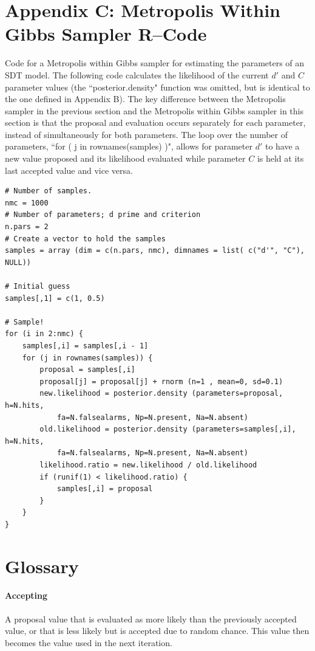 \section*{Appendix C: Metropolis Within Gibbs Sampler R--Code}

Code for a Metropolis within Gibbs sampler for estimating the parameters of an SDT model. The following code calculates the likelihood of the current $d'$ and $C$ parameter values (the ``posterior.density" function was omitted, but is identical to the one defined in Appendix B). The key difference between the Metropolis sampler in the previous section and the Metropolis within Gibbs sampler in this section is that the proposal and evaluation occurs separately for each parameter, instead of simultaneously for both parameters. The loop over the number of parameters, ``for ( j in rownames(samples) )", allows for parameter $d'$ to have a new value proposed and its likelihood evaluated while parameter $C$ is held at its last accepted value and vice versa.

\begin{verbatim}
# Number of samples.
nmc = 1000 	
# Number of parameters; d prime and criterion
n.pars = 2 
# Create a vector to hold the samples
samples = array (dim = c(n.pars, nmc), dimnames = list( c("d'", "C"), NULL))
	
# Initial guess
samples[,1] = c(1, 0.5) 	
	
# Sample!
for (i in 2:nmc) {
    samples[,i] = samples[,i - 1]
    for (j in rownames(samples)) {
        proposal = samples[,i]
        proposal[j] = proposal[j] + rnorm (n=1 , mean=0, sd=0.1)
        new.likelihood = posterior.density (parameters=proposal, h=N.hits,
            fa=N.falsealarms, Np=N.present, Na=N.absent)
        old.likelihood = posterior.density (parameters=samples[,i], h=N.hits,
            fa=N.falsealarms, Np=N.present, Na=N.absent)
        likelihood.ratio = new.likelihood / old.likelihood
        if (runif(1) < likelihood.ratio) {
            samples[,i] = proposal
        }
    }
}
\end{verbatim}

\section*{Glossary}

	\paragraph{Accepting} A proposal value that is evaluated as more likely than the previously accepted value, or that is less likely but is accepted due to random chance. This value then becomes the value used in the next iteration.
